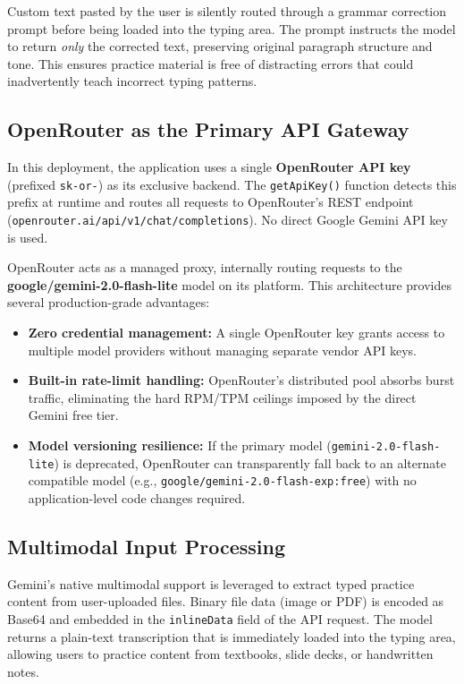\documentclass[conference]{IEEEtran}
\begin{document}
Custom text pasted by the user is silently routed through a grammar
correction prompt before being loaded into the typing area. The
prompt instructs the model to return \emph{only} the corrected text,
preserving original paragraph structure and tone. This ensures
practice material is free of distracting errors that could
inadvertently teach incorrect typing patterns.

\subsection{OpenRouter as the Primary API Gateway}

In this deployment, the application uses a single 
\textbf{OpenRouter API key} (prefixed \texttt{sk-or-}) as its
exclusive backend. The \texttt{getApiKey()} function detects this
prefix at runtime and routes all requests to OpenRouter's REST
endpoint (\texttt{openrouter.ai/api/v1/chat/completions}).
No direct Google Gemini API key is used.

OpenRouter acts as a managed proxy, internally routing requests to
the \textbf{google/gemini-2.0-flash-lite} model on its platform.
This architecture provides several production-grade advantages:
\begin{itemize}
  \item \textbf{Zero credential management:} A single OpenRouter
        key grants access to multiple model providers without
        managing separate vendor API keys.
  \item \textbf{Built-in rate-limit handling:} OpenRouter's
        distributed pool absorbs burst traffic, eliminating the
        hard RPM/TPM ceilings imposed by the direct Gemini free tier.
  \item \textbf{Model versioning resilience:} If the primary model
        (\texttt{gemini-2.0-flash-lite}) is deprecated, OpenRouter
        can transparently fall back to an alternate compatible model
        (e.g., \texttt{google/gemini-2.0-flash-exp:free}) with no
        application-level code changes required.
\end{itemize}

\subsection{Multimodal Input Processing}

Gemini's native multimodal support is leveraged to extract typed
practice content from user-uploaded files. Binary file data (image or
PDF) is encoded as Base64 and embedded in the
\texttt{inlineData} field of the API request. The model returns a
plain-text transcription that is immediately loaded into the typing
area, allowing users to practice content from textbooks, slide decks,
or handwritten notes.
\end{document}
